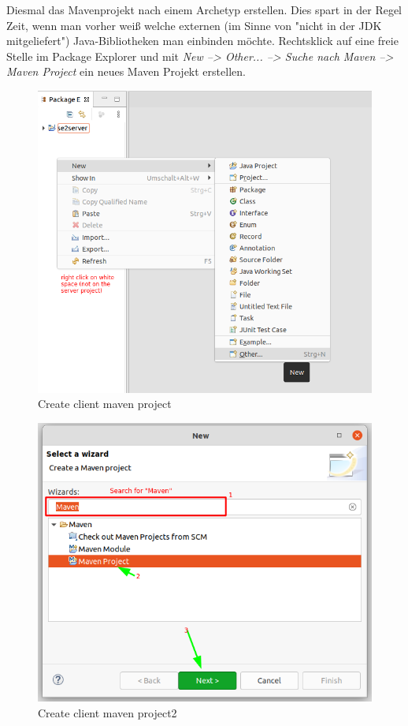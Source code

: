 \documentclass[11pt]{scrartcl}
\begin{document}
Diesmal das Mavenprojekt nach einem Archetyp erstellen. 
Dies spart in der Regel Zeit, wenn man vorher weiß
welche externen (im Sinne von "nicht in der JDK mitgeliefert")
Java-Bibliotheken man einbinden möchte. Rechtsklick auf eine
freie Stelle im Package Explorer und mit 
\textit{New --> Other... --> Suche nach Maven --> Maven Project}
ein neues Maven Projekt erstellen.
\begin{figure}[!ht]
    \includegraphics[width=\linewidth]{images/eclipse14_client_maven_project.png}
    \caption{Create client maven project}
    \label{fig:createclientproject}
\end{figure}

\newpage
\begin{figure}[!ht]
    \includegraphics[width=\linewidth]{images/eclipse15_client_maven_project2.png}
    \caption{Create client maven project2}
    \label{fig:createclientproject2}
\end{figure}
\end{document}
